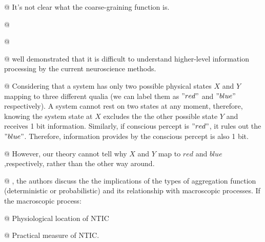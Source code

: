 \documentclass[utf8]{article}
\begin{document}
		
        \begin{WritingMaterials}
            @ It's not clear what the coarse-graining function is.

			@  \cite{price2007causation}

			@  \cite{price2007causation}

			@ \cite{jonas2017could} well demonstrated that it is difficult to understand higher-level information processing by the current neuroscience methods.
        
        
        
            
            
            @ Considering that a system has only two possible physical states $X$ and $Y$ mapping to three different qualia (we can label them as $"red"$ and $"blue"$ respectively). A system cannot rest on two states at any moment, therefore, knowing the system state at $X$ excludes the the other possible state $Y$ and receives 1 bit information. Similarly, if conscious percept is $"red"$, it rules out the $"blue"$. Therefore, information provides by the conscious percept is also 1 bit. 
            
            @ However, our theory cannot tell why $X$ and $Y$ map to $red$ and $blue$ ,respectively, rather than the other way around. 
            
            @ \cite{PFANTE.2014}, the authors discuss the the implications of the types of aggregation function (deterministic or probabilistic) and its relationship with macroscopic processes. If the macroscopic process: 
        
			
			@ Physiological location of NTIC
			
			@ Practical measure of NTIC. 

        
        
        
        
		\end{WritingMaterials}		
\end{document}
